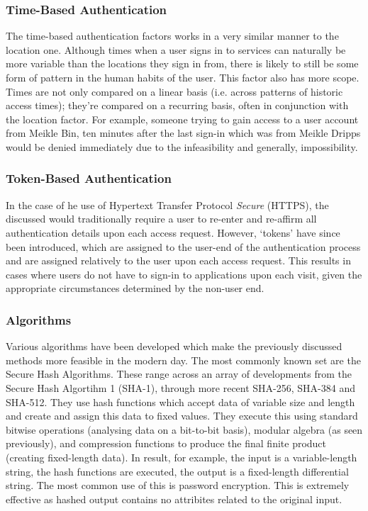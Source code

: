 \documentclass[11pt, english]{article}
\begin{document}
		\subsubsection{Time-Based Authentication}

	The time-based authentication factors works in a very similar manner to the location one. Although times when a user signs in to services can naturally be more variable than the locations they sign in from, there is likely to still be some form of pattern in the human habits of the user. This factor also has more scope. Times are not only compared on a linear basis (i.e. across patterns of historic access times); they're compared on a recurring basis, often in conjunction with the location factor. For example, someone trying to gain access to a user account from Meikle Bin, ten minutes after the last sign-in which was from Meikle Dripps would be denied immediately due to the infeasibility and generally, impossibility.

		\subsubsection{Token-Based Authentication}

	In the case of he use of Hypertext Transfer Protocol \textit{Secure} (HTTPS), the discussed would traditionally require a user to re-enter and re-affirm all authentication details upon each access request. However, `tokens' have since been introduced, which are assigned to the user-end of the authentication process and are assigned relatively to the user upon each access request. This results in cases where users do not have to sign-in to applications upon each visit, given the appropriate circumstances determined by the non-user end.

		\subsubsection{Algorithms}

	Various algorithms have been developed which make the previously discussed methods more feasible in the modern day. The most commonly known set are the Secure Hash Algorithms. These range across an array of developments from the Secure Hash Algortihm 1 (SHA-1), through more recent SHA-256, SHA-384 and SHA-512. They use hash functions which accept data of variable size and length and create and assign this data to fixed values. They execute this using standard bitwise operations (analysing data on a bit-to-bit basis), modular algebra (as seen previously), and compression functions to produce the final finite product (creating fixed-length data). In result, for example, the input is a variable-length string, the hash functions are executed, the output is a fixed-length differential string. The most common use of this is password encryption. This is extremely effective as hashed output contains no attribites related to the original input.\\
\end{document}
